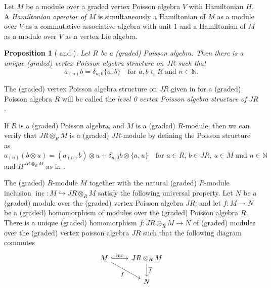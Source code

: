 \documentclass[a4paper, 12pt, reqno]{amsart}
\newtheorem{proposition}[theorem]{Proposition}
\theoremstyle{remark}
\DeclareMathOperator{\inc}{inc}
\begin{document}
Let $M$ be a module over a graded vertex Poisson algebra $V$ with Hamiltonian $H$.
A \emph{Hamiltonian operator of $M$} is simultaneously a Hamiltonian of $M$ as a module over $V$ as a commutative associative algebra with unit $1$ and a Hamiltonian of $M$ as a module over $V$ as a vertex Lie algebra.

\begin{proposition}[{\cite[Proposition 2.3.1]{arakawa_remark_2012}} and {}]
  \label{prp:4}
  Let $R$ be a (graded) Poisson algebra.
  Then there is a unique (graded) vertex Poisson algebra structure on $JR$ such that
  \begin{equation*}
    a_{(n)}b = \delta_{n, 0}\{a, b\} \quad \text{for $a, b \in R$ and $n \in \mathbb{N}$}.
  \end{equation*}
\end{proposition}

The (graded) vertex Poisson algebra structure on $JR$ given in  for a (graded) Poisson algebra $R$ will be called the \emph{level 0 vertex Poisson algebra structure of $JR$}.

If $R$ is a (graded) Poisson algebra, and $M$ is a (graded) $R$-module, then we can verify that $JR \otimes_R M$ is a (graded) $JR$-module by defining the Poisson structure as
\begin{equation*}
  a_{(n)}(b\otimes u) = (a_{(n)}b)\otimes u + \delta_{n, 0}b\otimes\{a, u\} \quad \text{for $a \in R$, $b \in JR$, $u \in M$ and $n \in \mathbb{N}$}
\end{equation*}
and $H^{JR \otimes_R M}$ as in .

The (graded) $R$-module $M$ together with the natural (graded) $R$-module inclusion $\inc: M \hookrightarrow JR \otimes_R M$ satisfy the following universal property.
Let $N$ be a (graded) module over the (graded) vertex Poisson algebra $JR$, and let $f: M \to N$ be a (graded) homomorphism of modules over the (graded) Poisson algebra $R$.
There is a unique (graded) homomorphism $\overline{f}: JR \otimes_R M \to N$ of (graded) modules over the (graded) vertex poisson algebra $JR$ such that the following diagram commutes
\begin{equation*}
  \begin{tikzcd}
    M \arrow[r, "\inc", hook] \arrow[rd, "f"'] & JR \otimes_R M \arrow[d, "\overline{f}"] \\
    & N
  \end{tikzcd}
\end{equation*}
\end{document}
